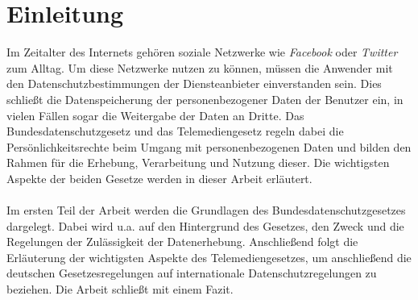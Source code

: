 \chapter{Einleitung}
Im Zeitalter des Internets gehören soziale Netzwerke wie \textit{Facebook} oder \textit{Twitter} zum Alltag. Um diese Netzwerke nutzen zu können, müssen die Anwender mit den Datenschutzbestimmungen der Diensteanbieter einverstanden sein. Dies schließt die Datenspeicherung der personenbezogener Daten der Benutzer ein, in vielen Fällen sogar die Weitergabe der Daten an Dritte. Das Bundesdatenschutzgesetz und das Telemediengesetz regeln dabei die Persönlichkeitsrechte beim Umgang mit personenbezogenen Daten und bilden den Rahmen für die Erhebung, Verarbeitung und Nutzung dieser. Die wichtigsten Aspekte der beiden Gesetze werden in dieser Arbeit erläutert.\\
\\Im ersten Teil der Arbeit werden die Grundlagen des Bundesdatenschutzgesetzes dargelegt. Dabei wird u.a. auf den Hintergrund des Gesetzes, den Zweck und die Regelungen der Zulässigkeit der Datenerhebung. Anschließend folgt die Erläuterung der wichtigsten Aspekte des Telemediengesetzes, um anschließend die deutschen Gesetzesregelungen auf internationale Datenschutzregelungen zu beziehen. Die Arbeit schließt mit einem Fazit.